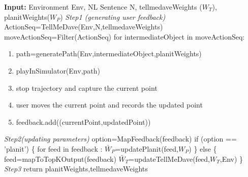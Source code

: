\textbf{Input:} Environment Env, NL Sentence N, tellmedaveWeights ($W_{T}$), planitWeights($W_{P}$)
\newline \newline
\textit{Step1 (generating user feedback)} \newline \newline
ActionSeq=TellMeDave(Env,N,tellmedaveWeights)  
moveActionSeq=Filter(ActionSeq)  \newline  \newline
for intermediateObject in moveActionSeq:
\begin{enumerate}
\item path=generatePath(Env,intermediateObject,planitWeights)
\item playInSimulator(Env,path)
\item stop trajectory and capture the current point
\item user moves the current point and records the updated point
\item feedback.add((currentPoint,updatedPoint))
\end{enumerate}
\pagebreak
\textit{Step2(updating parameters)} \newline \newline
option=MapFeedback(feedback) \newline
if (option == 'planit') \newline
\{ \newline
\hphantom {1}for feed in feedback : \newline
\hphantom {1} \hphantom {1} $\bar{W}_{P}$=updatePlanit(feed,$W_{P}$) \newline
\} \newline
else \newline
\{ \newline
\hphantom {1}feed=mapToTopKOutput(feedback)
\hphantom {1}$\bar{W}_{T}$=updateTellMeDave(feed,$W_{T}$,Env) \newline
\} \newline \newline
\textit{Step3} \newline 
return planitWeights,tellmedaveWeights \newline
